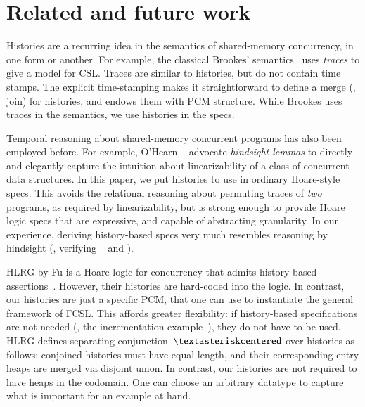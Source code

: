 \section{Related and future work}
\label{sec:related}
Histories are a recurring idea in the semantics of shared-memory
concurrency, in one form or another. For example, the classical
Brookes' semantics~\cite{Brookes:TCS07} uses \emph{traces} to give a
model for CSL.
%
%
Traces are similar to histories, but do not contain time stamps. The
explicit time-stamping makes it straightforward to define a merge
(\ie, join) for histories, and endows them with PCM structure. While
Brookes uses traces in the semantics, we use histories in the specs.


Temporal reasoning about shared-memory concurrent programs has also
been employed before. For example, O'Hearn
\etal~\cite{OHearn-al:PODC10} advocate \emph{hindsight lemmas} to
directly and elegantly capture the intuition about linearizability of
a class of concurrent data structures. In this paper, we put histories
to use in ordinary Hoare-style specs. This avoids the relational
reasoning about permuting traces of \emph{two} programs, as required
by linearizability, but is strong enough to provide Hoare logic specs
that are expressive, and capable of abstracting granularity. In our
experience, deriving history-based specs very much resembles reasoning
by hindsight (\eg, verifying ~\cite{OHearn-al:PODC10} and
).


HLRG by Fu \etal is a Hoare logic for concurrency that admits
history-based assertions~\cite{Fu-al:CONCUR10}. However, their
histories are hard-coded into the logic. In contrast, our histories
are just a specific PCM, that one can use to instantiate the general
framework of FCSL. This affords greater flexibility: if history-based
specifications are not needed (\eg, the incrementation
example~\cite{Nanevski-al:ESOP14}), they do not have to be used.  HLRG
defines separating conjunction~$\sep$ over histories as follows:
conjoined histories must have equal length, and their corresponding
entry heaps are merged via disjoint union.  In contrast, our histories
are not required to have heaps in the codomain. One can choose an
arbitrary datatype to capture what is important for an example at
hand.

